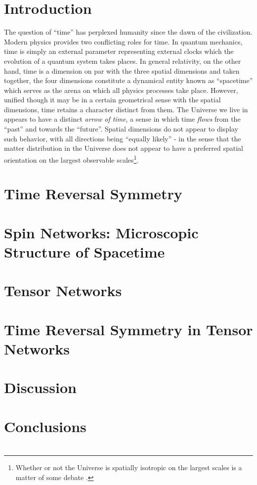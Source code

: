 \documentclass[entropy,article,submit,oneauthor,pdftex,12pt,a4paper]{mdpi}
\begin{document}
\section{Introduction}

The question of ``time'' has perplexed humanity since the dawn of the civilization. Modern physics provides two conflicting roles for time. In quantum mechanics, time is simply an external parameter representing external clocks \wrt which the evolution of a quantum system takes places. In general relativity, on the other hand, time is a dimension on par with the three spatial dimensions and taken together, the four dimensions constitute a dynamical entity known as ``spacetime'' which serves as the arena on which all physics processes take place. However, unified though it may be in a certain geometrical sense with the spatial dimensions, time retains a character distinct from them. The Universe we live in appears to have a distinct \textit{arrow of time}, a sense in which time \emph{flows} from the ``past'' and towards the ``future''. Spatial dimensions do not appear to display such behavior, with all directions being ``equally likely'' - in the sense that the matter distribution in the Universe does not appear to have a preferred spatial orientation on the largest observable scales\footnote{Whether or not the Universe is spatially isotropic on the largest scales is a matter of some debate \cite{Land2005Examination}.}.

\section{Time Reversal Symmetry}



\section{Spin Networks: Microscopic Structure of Spacetime}

\section{Tensor Networks}

\section{Time Reversal Symmetry in Tensor Networks}

\section{Discussion}


\section{Conclusions}

\acknowledgments{}

\appendix
\section{}

\section{}



\renewcommand\bibname{References}


\end{document}
